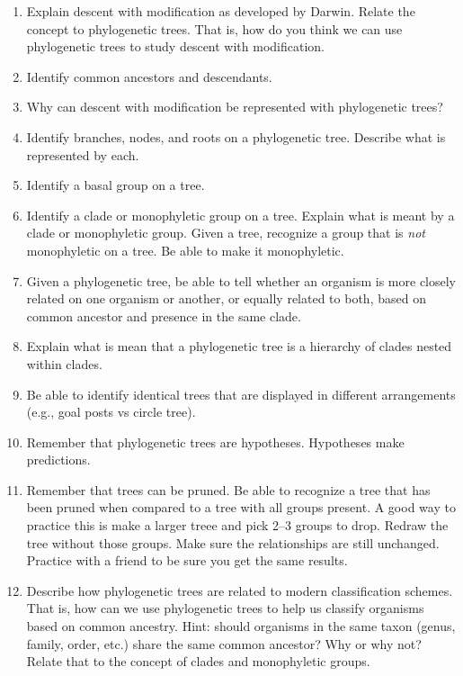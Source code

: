 \documentclass[letterpaper]{tufte-handout}
\begin{document}
\begin{enumerate}

	\item Explain descent with modification as developed by Darwin. Relate the concept to phylogenetic trees. That is, how do you think we can use phylogenetic trees to study descent with modification. 

	\item Identify common ancestors and descendants.

	\item Why can descent with modification be represented with phylogenetic trees? 

	\item Identify branches, nodes, and roots on a phylogenetic tree. Describe what is represented by each.

	\item Identify a basal group on a tree.

	\item Identify a clade or monophyletic group on a tree. Explain what is meant by a clade or monophyletic group. Given a tree, recognize a group that is \emph{not} monophyletic on a tree.  Be able to make it monophyletic.

	\item Given a phylogenetic tree, be able to tell whether an organism is more closely related on one organism or another, or equally related to both, based on common ancestor and presence in the same clade. 

	\item Explain what is mean that a phylogenetic tree is a hierarchy of clades nested within clades.

	\item Be able to identify identical trees that are displayed in different arrangements (e.g., goal posts vs circle tree).

	\item Remember that phylogenetic trees are hypotheses. Hypotheses make predictions.

	\item Remember that trees can be pruned. Be able to recognize a tree that has been pruned when compared to a tree with all groups present. A good way to practice this is make a larger treee and pick 2--3 groups to drop. Redraw the tree without those groups. Make sure the relationships are still unchanged. Practice with a friend to be sure you get the same results.

	\item Describe how phylogenetic trees are related to modern classification schemes. That is, how can we use phylogenetic trees to help us classify organisms based on common ancestry. Hint: should organisms in the same taxon (genus, family, order, etc.) share the same common ancestor? Why or why not? Relate that to the concept of clades and monophyletic groups.

\end{enumerate}
\end{document}
